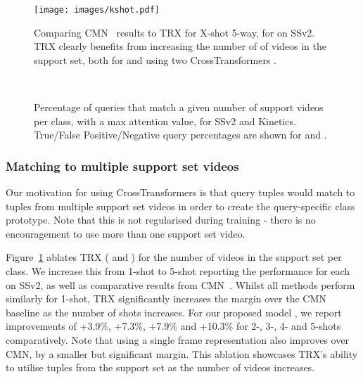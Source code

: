 \documentclass[final]{cvpr}
\begin{document}
\begin{figure}[t]
\centering
\texttt{[image: images/kshot.pdf]}
\caption{Comparing CMN~\cite{Zhu2020} results to TRX for X-shot 5-way, for  on SSv2. TRX clearly benefits from increasing the number of of videos in the support set, both for  and using two CrossTransformers .\vspace*{-14pt}}
\label{fig:kshot}
\end{figure}

\begin{figure}
\centering
{}
 \\
\vspace{-5pt}
\caption{Percentage of queries that match a given number of support videos per class, with a max attention value, for SSv2 and Kinetics.  True/False Positive/Negative query percentages are shown for  and .}
    \label{fig:observed}
\end{figure}


\subsubsection{Matching to multiple support set videos}\label{sec:ablation_look_vids}
\vspace*{-5pt}

Our motivation for using CrossTransformers is that query tuples would match to tuples from multiple support set videos in order to create the query-specific class prototype. Note that this is not regularised during training - \ie there is no encouragement to use more than one support set video.

Figure~\ref{fig:kshot} ablates TRX ( and ) for the number of videos in the support set per class. We increase this from 1-shot to 5-shot reporting the performance for each on SSv2, as well as comparative results from CMN~\cite{Zhu2020}.  Whilst all methods perform similarly for 1-shot, TRX significantly increases the margin over the CMN baseline as the number of shots increases. For our proposed model , we report improvements of +3.9\%, +7.3\%, +7.9\% and +10.3\% for 2-, 3-, 4- and 5-shots comparatively. Note that using a single frame representation also improves over CMN, by a smaller but significant margin. This ablation showcases TRX's ability to utilise tuples from the support set as the number of videos increases. 
\end{document}
